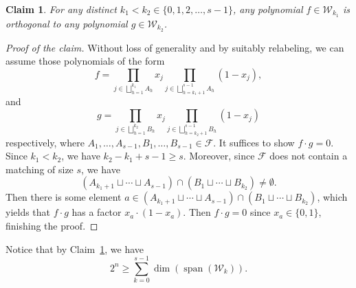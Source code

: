 \documentclass[11pt]{article}
\newtheorem{claim}[theorem]{Claim}
\theoremstyle{definition}
\newenvironment{poc}{\begin{proof}[Proof of the claim]\renewcommand*{\qedsymbol}{$\blacksquare$}}{\end{proof}}
\begin{document}
\begin{claim}\label{claim:orthogonal of distinct w_k}
    For any distinct \(k_{1}<k_{2}\in\{0,1,2,\ldots,s-1\}\), any polynomial \(f\in\mathcal{W}_{k_{1}}\) is orthogonal to any polynomial \(g\in\mathcal{W}_{k_{2}}\).
\end{claim}
\begin{poc}
Without loss of generality and by suitably relabeling, we can assume those polynomials of the form
\[
f=\prod_{j\in \bigsqcup_{h=1}^{k_{1}}A_{h}}x_j\prod_{j\in \bigsqcup_{h=k_{1}+1}^{s-1}A_{h}}(1-x_j),
\]
and 
\[
g=\prod_{j\in \bigsqcup_{h=1}^{k_{2}}B_{h}}x_j\prod_{j\in \bigsqcup_{h=k_{2}+1}^{s-1}B_{h}}(1-x_j)
\]
respectively, where \(A_{1},\ldots,A_{s-1},B_{1},\ldots,B_{s-1}\in\mathcal{F}.\) It suffices to show \(f\cdot g=0.\)
Since \(k_{1}<k_{2}\), we have \(k_{2}-k_{1}+s-1\ge s\). Moreover, since \(\mathcal{F}\) does not contain a matching of size \(s\), we have
\[
(A_{k_{1}+1}\sqcup\cdots \sqcup A_{s-1}) \cap (B_{1}\sqcup\cdots \sqcup B_{k_{2}})\neq \emptyset.
\]
Then there is some element \(a\in (A_{k_{1}+1}\sqcup\cdots \sqcup A_{s-1}) \cap (B_{1}\sqcup\cdots \sqcup B_{k_{2}})\), which yields that \(f\cdot g\) has a factor \(x_{a}\cdot (1-x_{a})\). Then \(f\cdot g=0\) since \(x_{a}\in\{0,1\}\), finishing the proof.
\end{poc}
Notice that by Claim~\ref{claim:orthogonal of distinct w_k}, we have
\begin{equation}\label{equ:Span}
    2^{n}\ge \sum_{k=0}^{s-1} \dim(\operatorname{span}(\mathcal{W}_{k})).
\end{equation}
\end{document}
